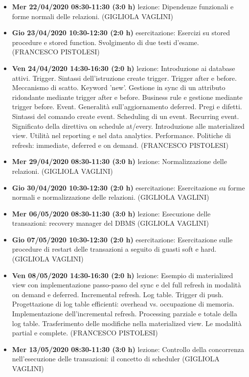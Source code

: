 \begin{itemize}
	\item \textbf{Mer 22/04/2020 08:30-11:30 (3:0 h)} lezione: Dipendenze funzionali e forme normali delle relazioni. (GIGLIOLA VAGLINI)
	\item \textbf{Gio 23/04/2020 10:30-12:30 (2:0 h)} esercitazione: Esercizi su stored procedure e stored function. Svolgimento di due testi d'esame. (FRANCESCO PISTOLESI)
	\item \textbf{Ven 24/04/2020 14:30-16:30 (2:0 h)} lezione: Introduzione ai database attivi. Trigger. Sintassi dell'istruzione create trigger. Trigger after e before. Meccanismo di scatto. Keyword 'new'. Gestione in sync di un attributo ridondante mediante trigger after e before. Business rule e gestione mediante trigger before. Event. Generalità sull'aggiornamento deferred. Pregi e difetti. Sintassi del comando create event. Scheduling di un event. Recurring event. Significato della direttiva on schedule at/every. Introduzione alle materialized view. Utilità nel reporting e nel data analytics. Performance. Politiche di refresh: immediate, deferred e on demand. (FRANCESCO PISTOLESI)
	\item \textbf{Mer 29/04/2020 08:30-11:30 (3:0 h)} lezione: Normalizzazione delle relazioni. (GIGLIOLA VAGLINI)
	\item \textbf{Gio 30/04/2020 10:30-12:30 (2:0 h)} esercitazione: Esercitazione su forme normali e normalizzazione delle relazioni. (GIGLIOLA VAGLINI)
	\item \textbf{Mer 06/05/2020 08:30-11:30 (3:0 h)} lezione: Esecuzione delle transazioni: recovery manager del DBMS (GIGLIOLA VAGLINI)
	\item \textbf{Gio 07/05/2020 10:30-12:30 (2:0 h)} esercitazione: Esercitazione sulle procedure di restart delle transazioni a seguito di guasti soft e hard. (GIGLIOLA VAGLINI)
	\item \textbf{Ven 08/05/2020 14:30-16:30 (2:0 h)} lezione: Esempio di materialized view con implementazione passo-passo del sync e del full refresh in modalità on demand e deferred. Incremental refresh. Log table. Trigger di push. Progettazione di log table efficienti: overhead vs. occupazione di memoria. Implementazione dell'incremental refresh. Processing parziale e totale della log table. Trasferimento delle modifiche nella materialized view. Le modalità partial e complete. (FRANCESCO PISTOLESI)
	\item \textbf{Mer 13/05/2020 08:30-11:30 (3:0 h)} lezione: Controllo della concorrenza nell'esecuzione delle transazioni: il concetto di scheduler (GIGLIOLA VAGLINI)

\end{itemize}
